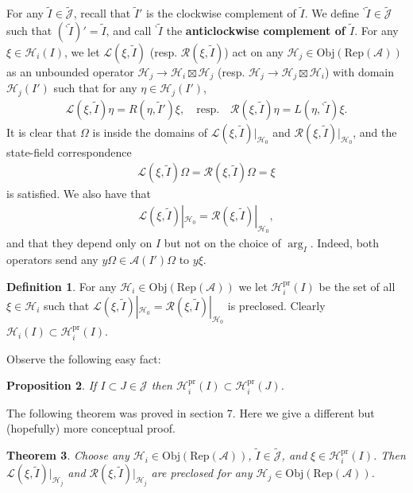 \documentclass[12pt,a4paper]{article}
\theoremstyle{definition}
\newtheorem{df}{Definition}[subsection]
\theoremstyle{plain}
\newtheorem{thm}[df]{Theorem}
\newtheorem{pp}[df]{Proposition}
\newcommand{\mc}{\mathcal}
\newcommand{\wtd}{\widetilde}
\newcommand{\scr}{\mathscr}
\newcommand{\Jtd}{\widetilde{\mathcal J}}
\newcommand{\RepA}{\mathrm{Rep}(\mc A)}
\newcommand{\Obj}{\mathrm{Obj}}
\newcommand{\bpr}{{}^\backprime}
\newcommand{\pr}{\mathrm{pr}}
\numberwithin{equation}{subsection}
\begin{document}
For any $\wtd I\in\Jtd$, recall that $\wtd I'$ is the clockwise complement of $\wtd I$. We define ${\bpr\wtd I}\in\Jtd$ such that $(\bpr\wtd I)'=\wtd I$, and call ${\bpr\wtd I}$ the \textbf{anticlockwise complement of $\wtd I$}.  For any $\xi\in\mc H_i(I)$, we let $\scr L(\xi,\wtd I)$ (resp. $\scr R(\xi,\wtd I)$) act on any $\mc H_j\in\Obj(\RepA)$ as an unbounded operator $\mc H_j\rightarrow\mc H_i\boxtimes\mc H_j$ (resp. $\mc H_j\rightarrow\mc H_j\boxtimes\mc H_i$) with domain $\mc H_j(I')$ such that for any $\eta\in\mc H_j(I')$,
\begin{align}
\scr L(\xi,\wtd I)\eta=R(\eta,\wtd I')\xi,\quad \text{resp.}  \quad \scr R(\xi,\wtd I)\eta=L(\eta,\bpr\wtd I)\xi.\label{eq7}
\end{align}
It is clear that $\Omega$ is inside the domains of $\scr L(\xi,\wtd I)|_{\mc H_0}$ and $\scr R(\xi,\wtd I)|_{\mc H_0}$, and the state-field correspondence
\begin{align}
\scr L(\xi,\wtd I)\Omega=\scr R(\xi,\wtd I)\Omega=\xi
\end{align}
is satisfied. We also have that
\begin{align}
\scr L(\xi,\wtd I)|_{\mc H_0}=\scr R(\xi,\wtd I)|_{\mc H_0},
\end{align}
and that they depend only on $I$ but not on the choice of $\arg_I$. Indeed, both operators send any $y\Omega\in\mc A(I')\Omega$ to $y\xi$.

\begin{df}
For any $\mc H_i\in\Obj(\RepA)$ we let $\mc H_i^\pr(I)$ \index{Hi@$\mc H_i^\pr(I)$} be the set of all $\xi\in\mc H_i$ such that $\scr L(\xi,\wtd I)|_{\mc H_0}=\scr R(\xi,\wtd I)|_{\mc H_0}$ is preclosed. Clearly $\mc H_i(I)\subset\mc H_i^\pr(I)$.
\end{df}
 

Observe the following easy fact:

\begin{pp}
	If $I\subset J\in\mc J$ then $\mc H_i^\pr(I)\subset\mc H_i^\pr(J)$.
\end{pp}

The following theorem was proved in \cite{Gui21b} section 7. Here we give a different but (hopefully) more conceptual proof.

\begin{thm}\label{lb12}
Choose any $\mc H_i\in\Obj(\RepA)$, $\wtd I\in\Jtd$, and $\xi\in\mc H_i^\pr(I)$. Then $\scr L(\xi,\wtd I)|_{\mc H_j}$ and $\scr R(\xi,\wtd I)|_{\mc H_j}$ are preclosed for any $\mc H_j\in\Obj(\RepA)$.
\end{thm}
\end{document}
